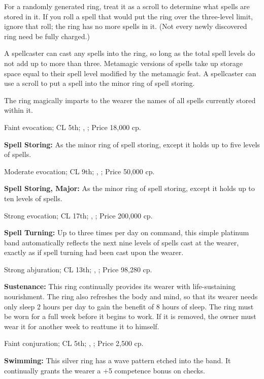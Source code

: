 For a randomly generated ring, treat it as a scroll to determine what spells are stored in it. If you roll a spell that would put the ring over the three-level limit, ignore that roll; the ring has no more spells in it. (Not every newly discovered ring need be fully charged.)

A spellcaster can cast any spells into the ring, so long as the total spell levels do not add up to more than three. Metamagic versions of spells take up storage space equal to their spell level modified by the metamagic feat. A spellcaster can use a scroll to put a spell into the minor ring of spell storing.

The ring magically imparts to the wearer the names of all spells currently stored within it.

Faint evocation; CL 5th; , ; Price 18,000 cp.

\textbf{Spell Storing:} As the minor ring of spell storing, except it holds up to five levels of spells.

Moderate evocation; CL 9th; , ; Price 50,000 cp.

\textbf{Spell Storing, Major:} As the minor ring of spell storing, except it holds up to ten levels of spells.

Strong evocation; CL 17th; , ; Price 200,000 cp.

\textbf{Spell Turning:} Up to three times per day on command, this simple platinum band automatically reflects the next nine levels of spells cast at the wearer, exactly as if spell turning had been cast upon the wearer.

Strong abjuration; CL 13th; , ; Price 98,280 cp.

\textbf{Sustenance:} This ring continually provides its wearer with life-sustaining nourishment. The ring also refreshes the body and mind, so that its wearer needs only sleep 2 hours per day to gain the benefit of 8 hours of sleep. The ring must be worn for a full week before it begins to work. If it is removed, the owner must wear it for another week to reattune it to himself.

Faint conjuration; CL 5th; , ; Price 2,500 cp.

\textbf{Swimming:} This silver ring has a wave pattern etched into the band. It continually grants the wearer a +5 competence bonus on  checks.

